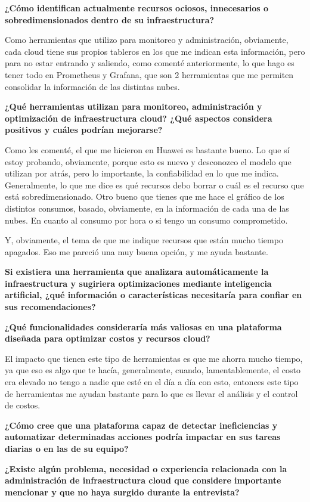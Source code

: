 \textbf{¿Cómo identifican actualmente recursos ociosos, innecesarios o sobredimensionados dentro de su infraestructura?}

Como herramientas que utilizo para monitoreo y administración, obviamente, cada cloud tiene sus propios tableros en los que me indican esta información, pero para no estar entrando y saliendo, como comenté anteriormente, lo que hago es tener todo en Prometheus y Grafana, que son 2 herramientas que me permiten consolidar la información de las distintas nubes.

\textbf{¿Qué herramientas utilizan para monitoreo, administración y optimización de infraestructura cloud? ¿Qué aspectos considera positivos y cuáles podrían mejorarse?}

Como les comenté, el que me hicieron en Huawei es bastante bueno. Lo que sí estoy probando, obviamente, porque esto es nuevo y desconozco el modelo que utilizan por atrás, pero lo importante, la confiabilidad en lo que me indica. Generalmente, lo que me dice es qué recursos debo borrar o cuál es el recurso que está sobredimensionado. Otro bueno que tienes que me hace el gráfico de los distintos consumos, basado, obviamente, en la información de cada una de las nubes. En cuanto al consumo por hora o si tengo un consumo comprometido.

Y, obviamente, el tema de que me indique recursos que están mucho tiempo apagados. Eso me pareció una muy buena opción, y me ayuda bastante.

\textbf{Si existiera una herramienta que analizara automáticamente la infraestructura y sugiriera optimizaciones mediante inteligencia artificial, ¿qué información o características necesitaría para confiar en sus recomendaciones?}

\textbf{¿Qué funcionalidades consideraría más valiosas en una plataforma diseñada para optimizar costos y recursos cloud?}

El impacto que tienen este tipo de herramientas es que me ahorra mucho tiempo, ya que eso es algo que te hacía, generalmente, cuando, lamentablemente, el costo era elevado no tengo a nadie que esté en el día a día con esto, entonces este tipo de herramientas me ayudan bastante para lo que es llevar el análisis y el control de costos.

\textbf{¿Cómo cree que una plataforma capaz de detectar ineficiencias y automatizar determinadas acciones podría impactar en sus tareas diarias o en las de su equipo?}

\textbf{¿Existe algún problema, necesidad o experiencia relacionada con la administración de infraestructura cloud que considere importante mencionar y que no haya surgido durante la entrevista?}

